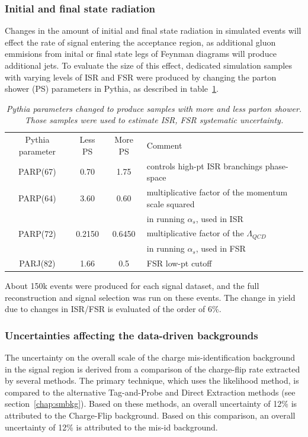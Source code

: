 \subsubsection{Initial and final state radiation}
Changes in the amount of initial and final state radiation in simulated events will
effect the rate of signal entering the acceptance region, as additional gluon
emmisions from inital or final state legs of Feynman diagrams will produce
additional jets.
To evaluate the size of this effect, dedicated simulation samples with varying levels of
ISR and FSR were produced by changing the parton shower (PS) parameters in Pythia, 
as described in table~\ref{tab:ISFFRS}.
\begin{table}[htbp]
\begin{center}
\caption{\textit{Pythia parameters changed to produce samples with more and less parton shower. Those samples were used to estimate ISR, FSR systematic uncertainty.}}
\label{tab:ISFFRS}
\begin{tabular}{c|c|c|l}
\hline\hline
Pythia parameter & Less PS & More PS & Comment\\
PARP(67) & 0.70   & 1.75   & controls high-pt ISR branchings phase-space \\
PARP(64) & 3.60   & 0.60   & multiplicative factor of the momentum scale squared\\
         &        &        & in running $\alpha_s$, used in ISR \\
PARP(72) & 0.2150 & 0.6450 & multiplicative factor of the $\Lambda_{QCD}$\\
         &        &        & in running $\alpha_s$, used in FSR \\
PARJ(82) & 1.66   & 0.5    & FSR low-pt cutoff \\
\hline
\end{tabular}
\end{center}
\end{table}
About 150k events were produced for each signal dataset, and the full reconstruction and signal selection was run on these events.
The change in yield due to changes in ISR/FSR is evaluated of the order of 6\%.



\subsubsection{Uncertainties affecting the data-driven backgrounds}
The uncertainty on the overall scale of the charge mis-identification background in the signal region is derived from a comparison of the charge-flip rate extracted by several methods.
The primary technique, which uses the likelihood method, is compared to the alternative Tag-and-Probe and Direct Extraction methods (see section~\ref{chap:smbkg}).
Based on these methods, an overall uncertainty of 12\% is attributed to the Charge-Flip background.
Based on this comparison, an overall uncertainty of 12\% is attributed to the mis-id background.

